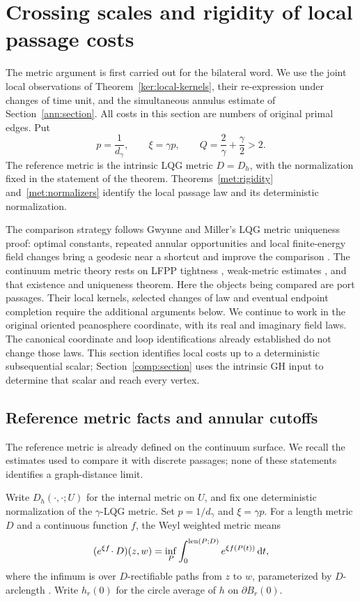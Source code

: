\section{Crossing scales and rigidity of local passage costs}
\label{met:section}

The metric argument is first carried out for the bilateral word.  We use
the joint local observations of Theorem~\ref{ker:local-kernels}, their
re-expression under changes of time unit, and the simultaneous annulus
estimate of Section~\ref{ann:section}.  All costs in this section are
numbers of original primal edges.  Put
\[
 p=\frac1{d_\gamma},\qquad \xi=\gamma p,\qquad
 Q=\frac2\gamma+\frac\gamma2>2.
\]
The reference metric is the intrinsic LQG metric $D=D_h$, with the
normalization fixed in the statement of the theorem.
Theorems~\ref{met:rigidity} and~\ref{met:normalizers} identify the local
passage law and its deterministic normalization.

The comparison strategy follows Gwynne and Miller's LQG metric uniqueness
proof: optimal constants, repeated annular opportunities and local
finite-energy field changes bring a geodesic near a shortcut and improve
the comparison
\cite[Section~1.5 and Sections~3--6]{GwynneMillerMetric}. The continuum
metric theory rests on LFPP tightness
\cite{DingDubedatDunlapFalconetTightness}, weak-metric estimates
\cite{DubedatEtAlWeakMetric}, and that existence and uniqueness theorem.
Here the objects being compared are port passages. Their local kernels,
selected changes of law and eventual endpoint completion require the
additional arguments below.  We continue to work in the original
oriented peanosphere coordinate, with its real and imaginary field
laws.  The canonical coordinate and loop identifications already
established do not change those laws.  This section identifies local
costs up to a deterministic subsequential scalar; Section~\ref{comp:section}
uses the intrinsic GH input to determine that scalar and reach every
vertex.

\subsection{Reference metric facts and annular cutoffs}

The reference metric is already defined on the continuum surface.  We
recall the estimates used to compare it with discrete passages; none
of these statements identifies a graph-distance limit.


Write $D_h(\cdot,\cdot;U)$ for the internal metric on $U$, and fix one
deterministic normalization of the $\gamma$-LQG metric.  Set
$p=1/d_\gamma$ and $\xi=\gamma p$. For a length metric $D$ and a
continuous function $f$, the Weyl weighted metric means
\[
 (e^{\xi f}\!\cdot D)(z,w)
 =\inf_P\int_0^{\operatorname{len}(P;D)}e^{\xi f(P(t))}\,\mathrm d t,
\]
where the infimum is over $D$-rectifiable paths from $z$ to $w$,
parameterized by $D$-arclength \citep{GwynneMillerMetric}.
Write $h_r(0)$ for the circle average of $h$ on $\partial B_r(0)$.

